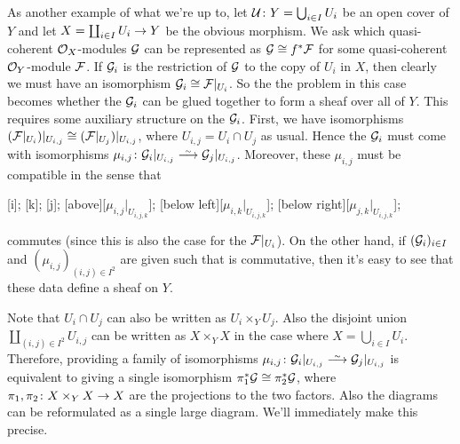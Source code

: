 \documentclass[a4paper,parskip=half,numbers=enddot, DIV=12]{scrreprt}
\begin{document}
As another example of what we're up to, let $\mathcal{U}\colon Y=\bigcup_{i\in I}U_i$ be an open cover of $Y$ and let $X=\coprod_{i\in I}U_i\morphism Y$ be the obvious morphism. We ask which quasi-coherent $\mathcal{O}_X$-modules $\mathcal{G}$ can be represented as $\mathcal{G}\cong f^*\mathcal{F}$ for some quasi-coherent $\mathcal{O}_Y$-module $\mathcal{F}$. If $\mathcal{G}_i$ is the restriction of $\mathcal{G}$ to the copy of $U_i$ in $X$, then clearly we must have an isomorphism $\mathcal{G}_i\cong \mathcal{F}|_{U_i}$. So the the problem in this case becomes whether the $\mathcal{G}_i$ can be glued together to form a sheaf over all of $Y$. This requires some auxiliary structure on the $\mathcal{G}_i$. First, we have isomorphisms $(\mathcal{F}|_{U_i})|_{U_{i,j}}\cong (\mathcal{F}|_{U_j})|_{U_{i,j}}$, where $U_{i,j}=U_i\cap U_j$ as usual. Hence the $\mathcal{G}_i$ must come with isomorphisms $\mu_{i,j}\colon \Gg_i|_{U_{i,j}}\isomorphism \Gg_j|_{U_{i,j}}$. Moreover, these $\mu_{i,j}$ must be compatible in the sense that
\begin{diagram}
	;
	;
	;
	\scriptsize
	[above][$\mu_{i,j}|_{U_{i,j,k}}$];
	[below left][$\mu_{i,k}|_{U_{i,j,k}}$];
	[below right][$\mu_{j,k}|_{U_{i,j,k}}$];
\end{diagram}
commutes (since this is also the case for the $\mathcal{F}|_{U_i}$). On the other hand, if $(\mathcal{G}_i)_{i\in I}$ and $(\mu_{i,j})_{(i,j)\in I^2}$ are given such that  is commutative, then it's easy to see that these data define a sheaf on $Y$.

 Note that $U_i\cap U_j$ can also be written as $U_i\times_YU_j$. Also the disjoint union $\coprod_{(i,j)\in I^2}U_{i,j}$ can be written as $X\times_YX$ in the case where $X=\bigcup_{i\in I}U_i$. Therefore, providing a family of isomorphisms $\mu_{i,j}\colon \Gg_i|_{U_{i,j}}\isomorphism \Gg_j|_{U_{i,j}}$ is equivalent to giving a single isomorphism $\pi_1^*\mathcal{G}\cong \pi_2^*\mathcal{G}$, where $\pi_1,\pi_2\colon X\times_YX\morphism X$ are the projections to the two factors. Also the diagrams  can be reformulated as a single large diagram. We'll immediately make this precise. 
 
\end{document}
